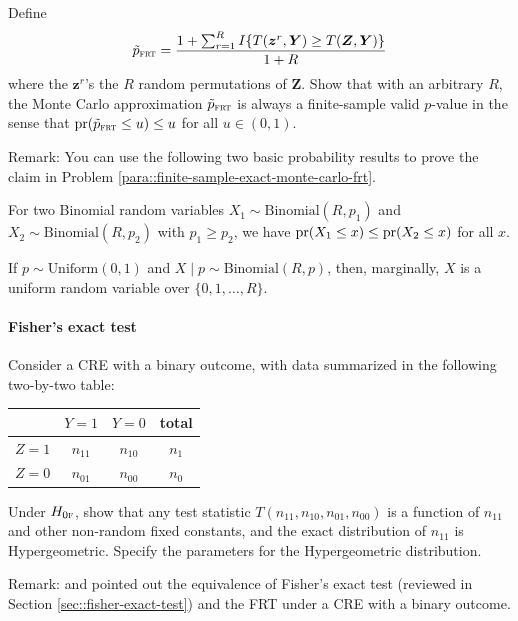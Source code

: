 Define 
$$
\tilde p_{\textsc{frt}}  =  \frac{  1 + \sum_{r=1}^R   I\{ T(\bm{z}^r,\bm{Y})   \geq T(\bm{Z},\bm{Y})   \}  }{1+R}
$$ 
where the $\bm{z}^r$'s the $R$ random permutations of $\bm{Z}$. Show that with an arbitrary $R$, the Monte Carlo approximation $\tilde p_{\textsc{frt}} $ is always a finite-sample valid $p$-value in the sense that $\textup{pr}(\tilde p_{\textsc{frt}} \leq u) \leq u$ for all $u\in (0,1)$.


 
Remark: You can use the following two basic probability results to prove the claim in Problem \ref{para::finite-sample-exact-monte-carlo-frt}. 


\begin{lemma}
\label{lemma::binomial-order}
For two Binomial random variables $X_1\sim \text{Binomial}(R, p_1)$ and $X_2\sim \text{Binomial}(R, p_2)$ with $p_1\geq p_2$, we have  $\textup{pr}(X_1\leq x) \leq  \textup{pr}(X_2\leq x) $ for all $x.$
\end{lemma}

\begin{lemma}
\label{lemma::uniform}
If $p\sim \text{Uniform}(0,1)$ and $X\mid p \sim \text{Binomial}(R, p)$, then, marginally, $X$ is a uniform random variable over $\{ 0,1,\ldots, R  \}$. 
\end{lemma}

 


\paragraph{Fisher's exact test}
\label{hw::frt-fisherexacttest}

Consider a CRE with a binary outcome, with data summarized in the following two-by-two table:
 \begin{center}
\begin{tabular}{lccc}
\hline 
        & $Y =1$ & $Y =0$& total\\\hline
$Z =1$ & $n_{11}$ & $n_{10}$ & $n_1$\\ 
$Z =0$ & $n_{01}$ & $n_{00}$ & $n_0$\\ 
\hline 
\end{tabular}
\end{center}
Under $H_{0\textsc{f}}$, show that any test statistic $T(n_{11}, n_{10}, n_{01}, n_{00})$ is a function of $n_{11}$ and other non-random fixed constants, and the exact distribution of $n_{11}$ is Hypergeometric. Specify the parameters for the Hypergeometric distribution. 

Remark: 
\citet{barnard1947significance} and \citet{Ding:2015} pointed out the equivalence of Fisher's exact test (reviewed in Section \ref{sec::fisher-exact-test}) and the FRT under a CRE  with a binary outcome. 





